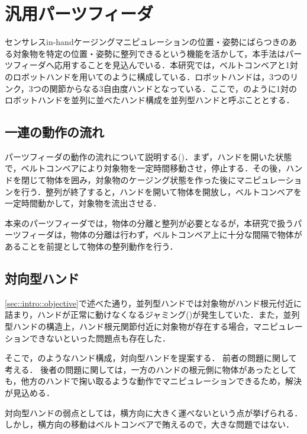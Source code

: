 \documentclass[a4paper,twoside,12pt,papersize, dvipdfmx]{iirthesis}
\begin{document}
\section{汎用パーツフィーダ}\label{sec::sicm::partsfeeder}
センサレスin-handケージングマニピュレーションの位置・姿勢にばらつきのある対象物を特定の位置・姿勢に整列できるという機能を活かして，本手法はパーツフィーダへ応用することを見込んでいる．本研究では，ベルトコンベアと1対のロボットハンドを用いて\figref{}のように構成している．ロボットハンドは，3つのリンク，3つの関節からなる3自由度ハンドとなっている．ここで，\figref{}のように1対のロボットハンドを並列に並べたハンド構成を並列型ハンドと呼ぶこととする．
\subsection{一連の動作の流れ\cite{kamikukita2022}}\label{subsec::sicm::flow}
パーツフィーダの動作の流れについて説明する(\figref{})．まず，ハンドを開いた状態で，ベルトコンベアにより対象物を一定時間移動させ，停止する．その後，ハンドを閉じて物体を囲み，対象物のケージング状態を作った後にマニピュレーションを行う．整列が終了すると，ハンドを開いて物体を開放し，ベルトコンベアを一定時間動かして，対象物を流出させる．\par
本来のパーツフィーダでは，物体の分離と整列が必要となるが，本研究で扱うパーツフィーダは，物体の分離は行わず，ベルトコンベア上に十分な間隔で物体があることを前提として物体の整列動作を行う．


\subsection{対向型ハンド}\label{subsec::sicm::oppositehand}
\ref{sec::intro::objective}で述べた通り，並列型ハンドでは対象物がハンド根元付近に詰まり，ハンドが正常に動けなくなるジャミング(\figref{})が発生していた．また，並列型ハンドの構造上，ハンド根元関節付近に対象物が存在する場合，マニピュレーションできないといった問題点も存在した．\par
そこで，\figref{}のようなハンド構成，対向型ハンドを提案する．
前者の問題に関して考える．%
後者の問題に関しては，一方のハンドの根元側に物体があったとしても，他方のハンドで掬い取るような動作でマニピュレーションできるため，解決が見込める．\par
対向型ハンドの弱点としては，横方向に大きく運べないという点が挙げられる．しかし，横方向の移動はベルトコンベアで賄えるので，大きな問題ではない．
\end{document}
